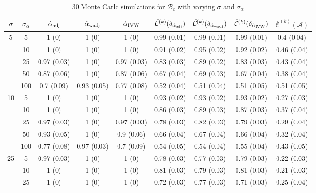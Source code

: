 \documentclass[11pt]{article}
\def\mc#1{\mathcal{#1}} %
\theoremstyle{definition}
\begin{document}
\begin{table}[t]
    \caption{30 Monte Carlo simulations for $\mc{B}_c$ with varying $\sigma$ and $\sigma_{\alpha}$} \label{table2} \vspace{-.2cm}
  \begin{center}
\begin{tabular}{cc|ccc|cccc}
 $\sigma$   & $\sigma_{\alpha}$ &  $\hat{\alpha}_{\rm adj}$  & $\hat{\alpha}_{\rm wadj}$ & $\hat{\alpha}_{\rm IVW}$  & $\bar{\mc{C}}^{(k)}(\delta_{\hat{\alpha}_{\rm adj}})$  & $\bar{\mc{C}}^{(k)}(\delta_{\hat{\alpha}_{\rm wadj}})$ & $\bar{\mc{C}}^{(k)}(\delta_{\hat{\alpha}_{\rm IVW}})$ &  $\bar{\mc{C}}^{(k)}(\mc{A})$ \\[.15cm]  
  \hline
 \multirow{5}{*}{5} & 5  & 1 (0) & 1 (0) & 1 (0) & 0.99 (0.01) & 0.99 (0.01) & 0.99 (0.01) & 0.4 (0.04) \\ 
  & 10  & 1 (0) & 1 (0) & 1 (0) & 0.91 (0.02) & 0.95 (0.02) & 0.92 (0.02) & 0.46 (0.04) \\ 
    & 25  & 0.97 (0.03) & 1 (0) & 0.97 (0.03) & 0.83 (0.03) & 0.89 (0.02) & 0.83 (0.03) & 0.43 (0.04) \\ 
   & 50  & 0.87 (0.06) & 1 (0) & 0.87 (0.06) & 0.67 (0.04) & 0.69 (0.03) & 0.67 (0.04) & 0.38 (0.04) \\ 
    & 100  & 0.7 (0.09) & 0.93 (0.05) & 0.77 (0.08) & 0.52 (0.04) & 0.51 (0.04) & 0.51 (0.05) & 0.51 (0.05) \\[.3cm] 
    \multirow{5}{*}{10} & 5  & 1 (0) & 1 (0) & 1 (0) & 0.93 (0.02) & 0.93 (0.02) & 0.93 (0.02) & 0.27 (0.03) \\ 
    & 10  & 1 (0) & 1 (0) & 1 (0) & 0.86 (0.03) & 0.89 (0.03) & 0.87 (0.03) & 0.37 (0.04) \\ 
    & 25  & 0.97 (0.03) & 1 (0) & 0.97 (0.03) & 0.78 (0.03) & 0.82 (0.03) & 0.79 (0.03) & 0.29 (0.04) \\ 
    & 50  & 0.93 (0.05) & 1 (0) & 0.9 (0.06) & 0.66 (0.04) & 0.67 (0.04) & 0.66 (0.04) & 0.32 (0.04) \\ 
    & 100  & 0.77 (0.08) & 0.97 (0.03) & 0.7 (0.09) & 0.54 (0.05) & 0.54 (0.04) & 0.55 (0.04) & 0.43 (0.05) \\[.3cm] 
    \multirow{5}{*}{25} & 5  & 0.97 (0.03) & 1 (0) & 1 (0) & 0.78 (0.03) & 0.77 (0.03) & 0.79 (0.03) & 0.22 (0.03) \\ 
    & 10  & 1 (0) & 1 (0) & 1 (0) & 0.81 (0.03) & 0.79 (0.03) & 0.81 (0.03) & 0.21 (0.03) \\ 
    & 25  & 1 (0) & 1 (0) & 1 (0) & 0.72 (0.03) & 0.77 (0.03) & 0.71 (0.03) & 0.25 (0.04) \\ 

\end{tabular}
\end{center}
\end{table}
\end{document}
